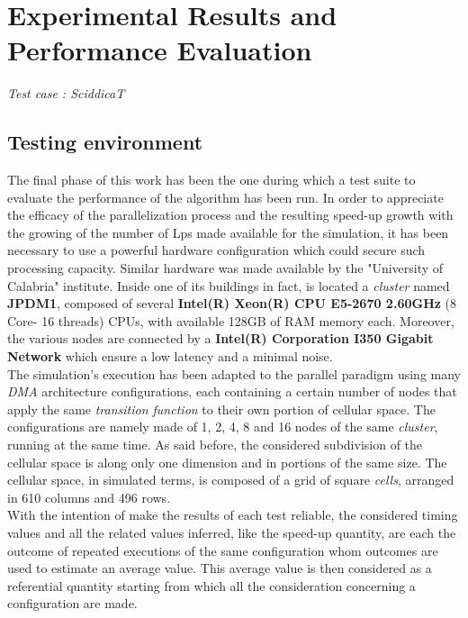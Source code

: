 \documentclass[12pt,a4paper,fleqn]{report}
\begin{document}
\chapter{Experimental Results and Performance Evaluation}{\Large{\textit{Test case : SciddicaT}}}\\
\section{Testing environment}
The final phase of this work has been the one during which a test suite to evaluate the performance of the algorithm has been run. In order to appreciate the efficacy of the parallelization process and the resulting speed-up growth with the growing of the number of Lps made available for the simulation, it has been necessary to use a powerful hardware configuration which could secure such processing capacity. Similar hardware was made available by the "University of Calabria" institute. Inside one of its buildings in fact, is located a \textit{cluster} named \textbf{JPDM1}, composed of several \textbf{Intel(R) Xeon(R) CPU E5-2670 2.60GHz } (8 Core- 16 threads) CPUs, with available 128GB of RAM memory each. Moreover, the various nodes are connected by a \textbf{Intel(R) Corporation I350 Gigabit Network} which ensure a low latency and a minimal noise. \\
The simulation's execution has been adapted to the parallel paradigm using many \textit{DMA} architecture configurations, each containing a certain number of nodes that apply the same \textit{transition function} to their own portion of cellular space. The configurations are namely made of 1, 2, 4, 8 and 16 nodes of the same \textit{cluster}, running at the same time. As said before, the considered subdivision of the cellular space is along only one dimension and in portions of the same size. The cellular space, in simulated terms, is composed of a grid of square \textit{cells}, arranged in 610 columns and 496 rows. \\
With the intention of make the results of each test reliable, the considered timing values and all the related values inferred, like the speed-up quantity, are each the outcome of repeated executions of the same configuration whom outcomes are used to estimate an average value. This average value is then considered as a referential quantity starting from which all the consideration concerning a configuration are made.
\end{document}
